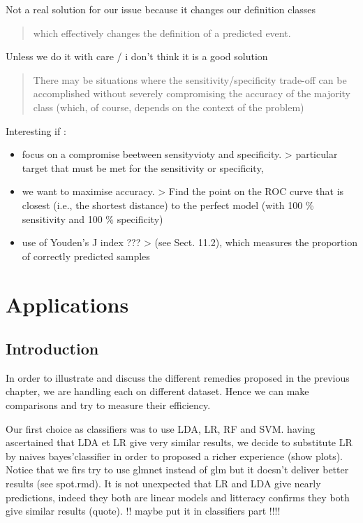 \documentclass[
]{report}
\providecommand{\tightlist}{%
  \setlength{\itemsep}{0pt}\setlength{\parskip}{0pt}}
\begin{document}
Not a real solution for our issue because it changes our definition classes

\begin{quote}
which eﬀectively changes the deﬁnition of a predicted event.
\end{quote}

Unless we do it with care / i don't think it is a good solution

\begin{quote}
There may be situations where the sensitivity/speciﬁcity trade-oﬀ can be accomplished without severely compromising the accuracy of the majority class (which, of course, depends on the context of the problem)
\end{quote}

Interesting if :

\begin{itemize}
\tightlist
\item
  focus on a compromise beetween sensityvioty and specificity.
  \textgreater{} particular target that must be met for the sensitivity or speciﬁcity,
\item
  we want to maximise accuracy.
  \textgreater{} Find the point on the ROC curve that is closest (i.e., the shortest distance) to the perfect model (with 100 \% sensitivity and 100 \% speciﬁcity)
\item
  use of Youden's J index ???
  \textgreater{} (see Sect. 11.2), which measures the proportion of correctly predicted samples
\end{itemize}

\hypertarget{applications}{%
\chapter{Applications}\label{applications}}

\hypertarget{introduction-1}{%
\section{Introduction}\label{introduction-1}}

In order to illustrate and discuss the different remedies proposed in the previous chapter, we are handling each on different dataset. Hence we can make comparisons and try to measure their efficiency.

Our first choice as classifiers was to use LDA, LR, RF and SVM. having ascertained that LDA et LR give very similar results, we decide to substitute LR by naives bayes'classifier in order to proposed a richer experience (show plots). Notice that we firs try to use glmnet instead of glm but it doesn't deliver better results (see spot.rmd). It is not unexpected that LR and LDA give nearly predictions, indeed they both are linear models and litteracy confirms they both give similar results (quote). !! maybe put it in classifiers part !!!!
\end{document}
